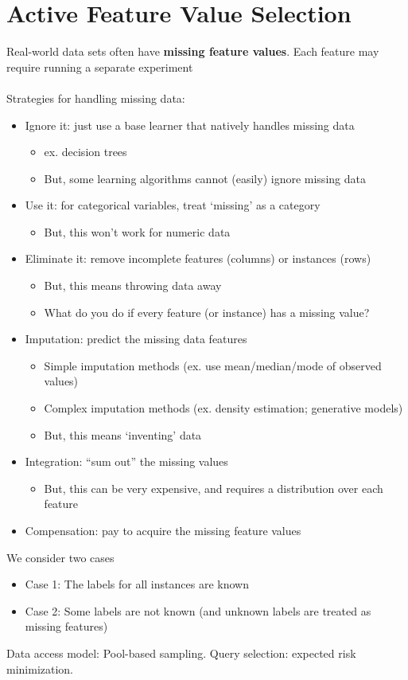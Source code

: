 \documentclass[10pt]{article}
\begin{document}
\section*{Active Feature Value Selection}
Real-world data sets often have \textbf{missing feature values}.  Each feature may require running a separate experiment\\\\
Strategies for handling missing data:
\begin{itemize}
	\item Ignore it: just use a base learner that natively handles missing data
	\begin{itemize}
	    \item ex. decision trees
	    \item But, some learning algorithms cannot (easily) ignore missing data
    \end{itemize}
    \item Use it: for categorical variables, treat `missing' as a category
    \begin{itemize}
	    \item But, this won't work for numeric data
    \end{itemize}
    \item Eliminate it: remove incomplete features (columns) or instances (rows)
    \begin{itemize}
	    \item But, this means throwing data away
	    \item What do you do if every feature (or instance) has a missing value?
    \end{itemize}
    \item Imputation: predict the missing data features
    \begin{itemize}
    	\item Simple imputation methods (ex. use mean/median/mode of observed values)
    	\item Complex imputation methods (ex. density estimation; generative models)
    	\item But, this means `inventing' data
    \end{itemize}
    \item Integration: ``sum out'' the missing values
    \begin{itemize}
	    \item But, this can be very expensive, and requires a distribution over each feature
    \end{itemize}
    \item Compensation: pay to acquire the missing feature values
\end{itemize}
We consider two cases
\begin{itemize}
	\item Case 1: The labels for all instances are known
	\item Case 2: Some labels are not known (and unknown labels are treated as missing features)
\end{itemize}
Data access model: Pool-based sampling.  Query selection: expected risk minimization.
\end{document}
